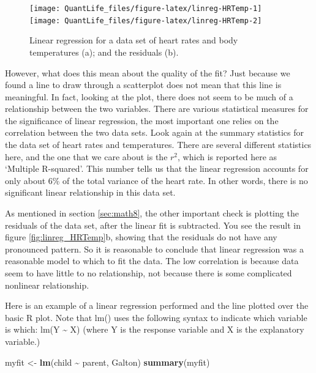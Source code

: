 \documentclass[
]{book}
\newenvironment{Shaded}{\begin{snugshade}}{\end{snugshade}}
\newcommand{\KeywordTok}[1]{\textcolor[rgb]{0.13,0.29,0.53}{\textbf{#1}}}
\newcommand{\NormalTok}[1]{#1}
\newcommand{\OperatorTok}[1]{\textcolor[rgb]{0.81,0.36,0.00}{\textbf{#1}}}
\newcommand{\StringTok}[1]{\textcolor[rgb]{0.31,0.60,0.02}{#1}}
\theoremstyle{definition}
\theoremstyle{definition}
\theoremstyle{definition}
\theoremstyle{remark}
\begin{document}
\begin{figure}

{\centering \texttt{[image: QuantLife\_files/figure-latex/linreg-HRTemp-1]} \texttt{[image: QuantLife\_files/figure-latex/linreg-HRTemp-2]} 

}

\caption{Linear regression for a data set of heart rates and body temperatures (a); and the residuals (b).}\label{fig:linreg-HRTemp}
\end{figure}

However, what does this mean about the quality of the fit? Just because we found a line to draw through a scatterplot does not mean that this line is meaningful. In fact, looking at the plot, there does not seem to be much of a relationship between the two variables. There are various statistical measures for the significance of linear regression, the most important one relies on the correlation between the two data sets. Look again at the summary statistics for the data set of heart rates and temperatures. There are several different statistics here, and the one that we care about is the \(r^2\), which is reported here as `Multiple R-squared'. This number tells us that the linear regression accounts for only about 6\% of the total variance of the heart rate. In other words, there is no significant linear relationship in this data set.

As mentioned in section \ref{sec:math8}, the other important check is plotting the residuals of the data set, after the linear fit is subtracted. You see the result in figure \ref{fig:linreg_HRTemp}b, showing that the residuals do not have any pronounced pattern. So it is reasonable to conclude that linear regression was a reasonable model to which to fit the data. The low correlation is because data seem to have little to no relationship, not because there is some complicated nonlinear relationship.

Here is an example of a linear regression performed and the line plotted over the basic R plot. Note that lm() uses the following syntax to indicate which variable is which: lm(Y \textasciitilde{} X) (where Y is the response variable and X is the explanatory variable.)

\begin{Shaded}
\begin{Highlighting}[]
\NormalTok{myfit \textless{}{-}}\StringTok{ }\KeywordTok{lm}\NormalTok{(child }\OperatorTok{\textasciitilde{}}\StringTok{ }\NormalTok{parent, Galton) }
\KeywordTok{summary}\NormalTok{(myfit)}
\end{Highlighting}
\end{Shaded}
\end{document}
